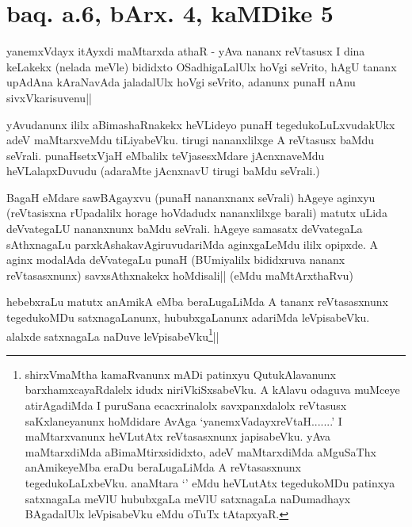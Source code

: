\section*{baq. a.6, bArx. 4, kaMDike 5}

\stext

yanemxVdayx itAyxdi maMtarxda athaR - yAva nananx reVtasusx I dina 
keLakekx (nelada meVle) bididxto OSadhigaLalUlx hoVgi seVrito, hAgU 
tananx upAdAna kAraNavAda jaladalUlx hoVgi seVrito, adanunx punaH nAnu 
sivxVkarisuvenu||

\begin{artha}
yAvudanunx ililx aBimashaRnakekx heVLideyo punaH tegedukoLuLxvudakUkx 
adeV maMtarxveMdu tiLiyabeVku. tirugi nananxlilxge A reVtasusx baMdu 
seVrali. punaHsetxVjaH eMbalilx teVjasesxMdare jAcnxnaveMdu 
heVLalapxDuvudu (adaraMte jAcnxnavU tirugi baMdu seVrali.)
\end{artha}


\begin{artha}
BagaH eMdare sawBAgayxvu (punaH nananxnanx seVrali) hAgeye aginxyu 
(reVtasisxna rUpadalilx horage hoVdadudx nananxlilxge barali) matutx 
uLida deVvategaLU nananxnunx baMdu seVrali. hAgeye samasatx 
deVvategaLa sAthxnagaLu parxkAshakavAgiruvudariMda aginxgaLeMdu ililx 
opipxde. A aginx modalAda deVvategaLu punaH (BUmiyalilx bididxruva 
nananx reVtasasxnunx) savxsAthxnakekx hoMdisali|| (eMdu maMtArxthaRvu)
\end{artha}


\begin{artha}
hebebxraLu matutx anAmikA eMba beraLugaLiMda A tananx reVtasasxnunx 
tegedukoMDu satxnagaLanunx, hububxgaLanunx adariMda leVpisabeVku. 
alalxde satxnagaLa naDuve leVpisabeVku\footnote[1]{shirxVmaMtha 
kamaRvanunx mADi patinxyu QutukAlavanunx barxhamxcayaRdalelx idudx 
niriVkiSxsabeVku. A kAlavu odaguva muMceye atirAgadiMda I puruSana 
ecacxrinalolx savxpanxdalolx reVtasusx saKxlaneyanunx hoMdidare AvAga 
`yanemxVadayxreVtaH.......' I maMtarxvanunx heVLutAtx reVtasasxnunx 
japisabeVku. yAva maMtarxdiMda aBimaMtirxsididxto, adeV maMtarxdiMda 
aMguSaThx anAmikeyeMba eraDu beraLugaLiMda A reVtasasxnunx 
tegedukoLaLxbeVku. anaMtara `\stext' eMdu heVLutAtx tegedukoMDu 
patinxya satxnagaLa meVlU hububxgaLa meVlU satxnagaLa naDumadhayx 
BAgadalUlx leVpisabeVku eMdu oTuTx tAtapxyaR.}||
\end{artha}

